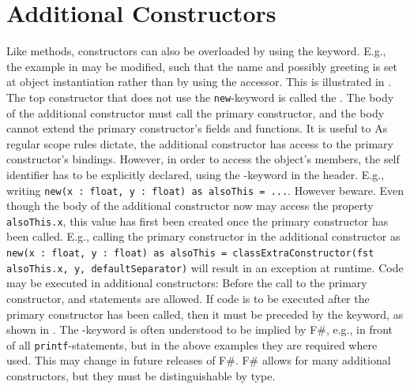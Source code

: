 \documentclass[fsharpNotes.tex]{subfiles}
\begin{document}
\section{Additional Constructors}
Like methods, constructors can also be overloaded by using the  keyword. E.g., the example in  may be modified, such that the name and possibly greeting is set at object instantiation rather than by using the accessor. This is illustrated in .
%
%
The top constructor that does not use the \lstinline{new}-keyword is called the . The body of the additional constructor must call the primary constructor, and the body cannot extend the primary constructor's fields and functions. It is useful to  As regular scope rules dictate, the additional constructor has access to the primary constructor's bindings. However, in order to access the object's members, the self identifier has to be explicitly declared, using the -keyword in the header. E.g., writing \lstinline{new(x : float, y : float) as alsoThis = ...}. However beware. Even though the body of the additional constructor now may access the property \lstinline{alsoThis.x}, this value has first been created once the primary constructor has been called. E.g., calling the primary constructor in the additional constructor as \lstinline{new(x : float, y : float) as alsoThis = classExtraConstructor(fst alsoThis.x, y, defaultSeparator)} will result in an exception at runtime. Code may be executed in additional constructors: Before the call to the primary constructor,  and  statements are allowed. If code is to be executed after the primary constructor has been called, then it must be preceded by the  keyword, as shown in .
%
%
The -keyword is often understood to be implied by F\#, e.g., in front of all \lstinline{printf}-statements, but in the above examples they are required where used. This may change in future releases of F\#. F\# allows for many additional constructors, but they must be distinguishable by type.
\clearpage
\end{document}
